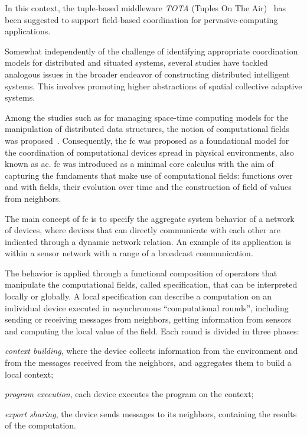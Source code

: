 \documentclass[12pt, a4paper]{article}
\newenvironment{inlinelist}{\begin{enumerate*}[label=\emph{(\roman*)}]}{\end{enumerate*}}
\begin{document}
In this context, the tuple-based middleware \textit{TOTA} (Tuples On The Air)~\cite{tota} has been suggested
to support field-based coordination for pervasive-computing applications.

Somewhat independently of the challenge of identifying appropriate coordination models for distributed and situated systems,
several studies have tackled analogous issues in the broader endeavor of constructing distributed intelligent systems.
%
This involves promoting higher abstractions of spatial collective adaptive systems.

Among the studies such as for managing space-time computing models for the manipulation of distributed data structures,
the notion of computational fields was proposed~\cite{JLAMP2019}.
%
Consequently, the \ac{fc} was proposed as a foundational model for the coordination of computational devices spread in physical environments,
also known as \ac{ac}.
%
\ac{fc} was introduced as a minimal core calculus with the aim of capturing the fundaments that make use of computational fields:
functions over and with fields, their evolution over time and the construction of field of values from neighbors.

The main concept of \ac{fc} is to specify the aggregate system behavior of a network of devices,
where devices that can directly communicate with each other are indicated through a dynamic network relation.
%
An example of its application is within a sensor network with a range of a broadcast communication.

The behavior is applied through a functional composition of operators that manipulate the computational fields,
called specification,
that can be interpreted locally or globally.
%
A local specification can describe a computation on an individual device executed in asynchronous ``computational rounds'',
including sending or receiving messages from neighbors,
getting information from sensors and computing the local value of the field.
%
Each round is divided in three phases:
\begin{inlinelist}
    \item \emph{context building}, where the device collects information from the environment and from the messages
    received from the neighbors, and aggregates them to build a local context;
    \item \emph{program execution}, each device executes the program on the context;
    \item \emph{export sharing}, the device sends messages to its neighbors, containing the results of the computation.
\end{inlinelist}
\end{document}
